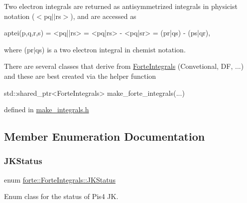 Two electron integrals are returned as antisymmetrized integrals in physicist notation ($<$pq$\vert$$\vert$rs$>$), and are accessed as \begin{DoxyVerb}aptei(p,q,r,s) = <pq||rs> = <pq|rs> - <pq|sr> = (pr|qs) - (ps|qr),
\end{DoxyVerb}


where (pr$\vert$qs) is a two electron integral in chemist notation.

There are several classes that derive from \mbox{\hyperlink{classforte_1_1_forte_integrals}{Forte\+Integrals}} (Convetional, DF, ...) and these are best created via the helper function \begin{DoxyVerb}std::shared_ptr<ForteIntegrals> make_forte_integrals(...)
\end{DoxyVerb}


defined in \textquotesingle{}\mbox{\hyperlink{make__integrals_8h}{make\+\_\+integrals.\+h}}\textquotesingle{} 

\subsection{Member Enumeration Documentation}
\mbox{\label{classforte_1_1_forte_integrals_a5ef066e57ff1494e90669779b1d0ecc2}} 
\subsubsection{\texorpdfstring{J\+K\+Status}{JKStatus}}
{\footnotesize\ttfamily enum \mbox{\hyperlink{classforte_1_1_forte_integrals_a5ef066e57ff1494e90669779b1d0ecc2}{forte\+::\+Forte\+Integrals\+::\+J\+K\+Status}}\hspace{0.3cm}{\ttfamily [strong]}}



Enum class for the status of Pis4 JK. 

